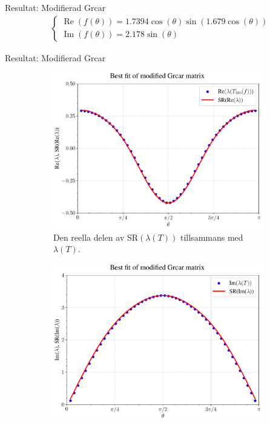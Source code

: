 \documentclass{beamer}
\begin{document}
\begin{frame}{Resultat: Modifierad Grcar}
\begin{align}
   &\begin{cases}
        \operatorname{Re}(f(\theta)) = 1.7394\cos(\theta)    \sin(1.679\cos(\theta))
        \\
        \operatorname{Im}(f(\theta)) = 2.178 \sin(\theta)
        \label{eq:Grcar1 A}
    \end{cases}
\end{align}
\end{frame}


\begin{frame}{Resultat: Modifierad Grcar}
 \begin{figure}[H]
    \centering
    \begin{subfigure}{0.49\textwidth}
        \includegraphics[width=\textwidth]{images/M_res2_re.pdf}
        \caption{Den reella delen av SR$(\lambda(T))$ tillsammans med $\lambda(T)$.}
        \label{fig:Mres2_re}
    \end{subfigure}
    \hfill
    \begin{subfigure}{0.49\textwidth}
        \includegraphics[width=\textwidth]{images/M_res2_im.pdf}

\end{subfigure}
\end{figure}
\end{frame}
\end{document}
